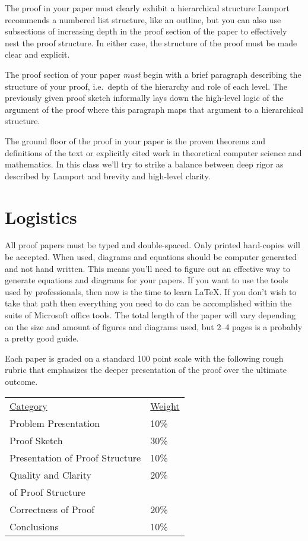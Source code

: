 \documentclass{tufte-handout}
\begin{document}
The proof in your paper must clearly exhibit a hierarchical structure  Lamport recommends a numbered list structure, like an outline, but you can also use subsections of increasing depth in the proof section of the paper to effectively nest the proof structure. In either case, the structure of the proof must be made clear and explicit.

The proof section of your paper \textit{must} begin with a brief paragraph describing the structure of your proof, i.e.\ depth of the hierarchy and role of each level.  The previously given proof sketch informally lays down the high-level logic of the argument of the proof where this paragraph maps that argument to a hierarchical structure.

The ground floor of the proof in your paper is the proven theorems and definitions of the text or explicitly cited work in theoretical computer science and mathematics. In this class we'll try to strike a balance between deep rigor as described by Lamport and brevity and high-level clarity.

\section{Logistics}

All proof papers must be typed and double-spaced. Only printed hard-copies will be accepted. When used, diagrams and equations should be computer generated and not hand written. This means you'll need to figure out an effective way to generate equations and diagrams for your papers.  If you want to use the tools used by professionals, then now is the time to learn \LaTeX. If you don't wish to take that path then everything you need to do can be accomplished within the suite of Microsoft office tools. The total length of the paper will vary depending on the size and amount of figures and diagrams used, but 2--4 pages is a probably a pretty good guide.

Each paper is graded on a standard 100 point scale with the following rough rubric that emphasizes the deeper presentation of the proof over the ultimate outcome.

\begin{center}
  \begin{tabular}{ll}
    \underline{Category} & \underline{Weight} \\
      Problem Presentation & 10\% \\
      Proof Sketch & 30\% \\
      Presentation of Proof Structure & 10\% \\
      Quality and Clarity & 20\% \\
      of Proof Structure \\
      Correctness of Proof & 20\% \\
      Conclusions & 10\%
  \end{tabular}
\end{center}
\end{document}

